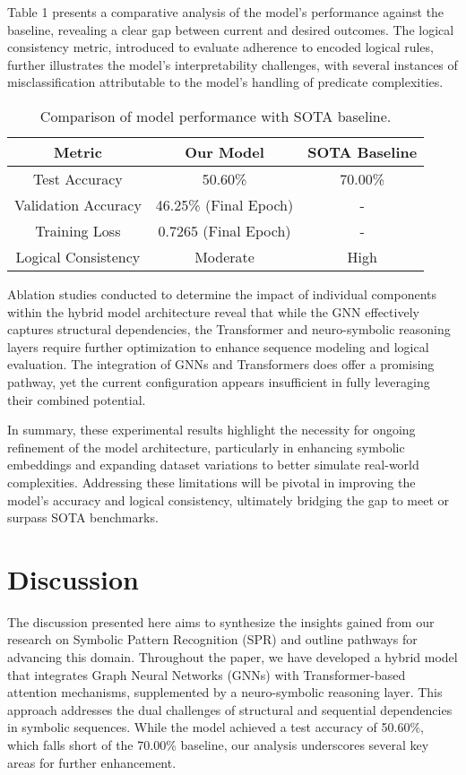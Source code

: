\documentclass{article}
\begin{document}
Table 1 presents a comparative analysis of the model's performance against the baseline, revealing a clear gap between current and desired outcomes. The logical consistency metric, introduced to evaluate adherence to encoded logical rules, further illustrates the model's interpretability challenges, with several instances of misclassification attributable to the model's handling of predicate complexities.

\begin{table}[h]
\centering
\begin{tabular}{|c|c|c|}
\hline
\textbf{Metric} & \textbf{Our Model} & \textbf{SOTA Baseline} \\
\hline
Test Accuracy & 50.60\% & 70.00\% \\
Validation Accuracy & 46.25\% (Final Epoch) & - \\
Training Loss & 0.7265 (Final Epoch) & - \\
Logical Consistency & Moderate & High \\
\hline
\end{tabular}
\caption{Comparison of model performance with SOTA baseline.}
\end{table}

Ablation studies conducted to determine the impact of individual components within the hybrid model architecture reveal that while the GNN effectively captures structural dependencies, the Transformer and neuro-symbolic reasoning layers require further optimization to enhance sequence modeling and logical evaluation. The integration of GNNs and Transformers does offer a promising pathway, yet the current configuration appears insufficient in fully leveraging their combined potential.

In summary, these experimental results highlight the necessity for ongoing refinement of the model architecture, particularly in enhancing symbolic embeddings and expanding dataset variations to better simulate real-world complexities. Addressing these limitations will be pivotal in improving the model's accuracy and logical consistency, ultimately bridging the gap to meet or surpass SOTA benchmarks.

\section{Discussion}
The discussion presented here aims to synthesize the insights gained from our research on Symbolic Pattern Recognition (SPR) and outline pathways for advancing this domain. Throughout the paper, we have developed a hybrid model that integrates Graph Neural Networks (GNNs) with Transformer-based attention mechanisms, supplemented by a neuro-symbolic reasoning layer. This approach addresses the dual challenges of structural and sequential dependencies in symbolic sequences. While the model achieved a test accuracy of 50.60\%, which falls short of the 70.00\% baseline, our analysis underscores several key areas for further enhancement.
\end{document}
